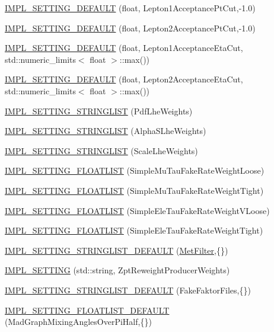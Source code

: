 \begin{DoxyCompactItemize}
\hyperlink{classHttSettings_ab8d151b450153fb32b2a421d7ee0ca41}{IMPL\_\-SETTING\_\-DEFAULT} (float, Lepton1AcceptancePtCut,-\/1.0)
\item 
\hyperlink{classHttSettings_a112b65cd9e21261b74816f2fadea34eb}{IMPL\_\-SETTING\_\-DEFAULT} (float, Lepton2AcceptancePtCut,-\/1.0)
\item 
\hyperlink{classHttSettings_a74b1b317822782e7dc991237867f860b}{IMPL\_\-SETTING\_\-DEFAULT} (float, Lepton1AcceptanceEtaCut, std::numeric\_\-limits$<$ float $>$::max())
\item 
\hyperlink{classHttSettings_a416d34e499691a6eeb0e026034b824db}{IMPL\_\-SETTING\_\-DEFAULT} (float, Lepton2AcceptanceEtaCut, std::numeric\_\-limits$<$ float $>$::max())
\item 
\hyperlink{classHttSettings_ac970b89b18a3285a6b20709b1372a4d7}{IMPL\_\-SETTING\_\-STRINGLIST} (PdfLheWeights)
\item 
\hyperlink{classHttSettings_adfc879b87f116121f3f5a0c4644cd59a}{IMPL\_\-SETTING\_\-STRINGLIST} (AlphaSLheWeights)
\item 
\hyperlink{classHttSettings_a224c669ebdf717c2310bd5d80ebedf40}{IMPL\_\-SETTING\_\-STRINGLIST} (ScaleLheWeights)
\item 
\hyperlink{classHttSettings_ae3eaf2427a38dc155a300447701af998}{IMPL\_\-SETTING\_\-FLOATLIST} (SimpleMuTauFakeRateWeightLoose)
\item 
\hyperlink{classHttSettings_aa818a821ac07f57f4b55254fa1352b19}{IMPL\_\-SETTING\_\-FLOATLIST} (SimpleMuTauFakeRateWeightTight)
\item 
\hyperlink{classHttSettings_a6b502d2417fae961ed7fd52ada54179e}{IMPL\_\-SETTING\_\-FLOATLIST} (SimpleEleTauFakeRateWeightVLoose)
\item 
\hyperlink{classHttSettings_a4f17d6b910aa47d38dcdb308ab4c348b}{IMPL\_\-SETTING\_\-FLOATLIST} (SimpleEleTauFakeRateWeightTight)
\item 
\hyperlink{classHttSettings_a3eeb2b6787abd3fbdda4854e283adfdf}{IMPL\_\-SETTING\_\-STRINGLIST\_\-DEFAULT} (\hyperlink{classMetFilter}{MetFilter},\{\})
\item 
\hyperlink{classHttSettings_ad109f6b7e230f5ce774887febfb7e248}{IMPL\_\-SETTING} (std::string, ZptReweightProducerWeights)
\item 
\hyperlink{classHttSettings_a95a362123622626e2ba115c9a0f701b5}{IMPL\_\-SETTING\_\-STRINGLIST\_\-DEFAULT} (FakeFaktorFiles,\{\})
\item 
\hyperlink{classHttSettings_acfacd3fac8bcf39c9d542077f20b540c}{IMPL\_\-SETTING\_\-FLOATLIST\_\-DEFAULT} (MadGraphMixingAnglesOverPiHalf,\{\})

\end{DoxyCompactItemize}
